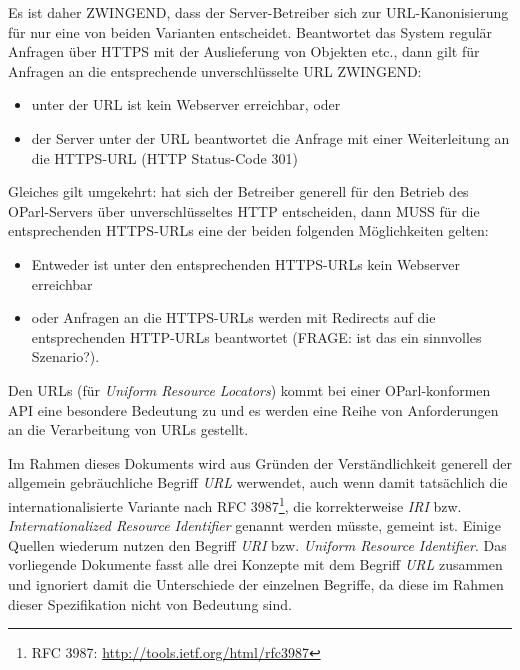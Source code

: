 \documentclass[,a4paper]{article}
\begin{document}
Es ist daher ZWINGEND, dass der Server-Betreiber sich zur
URL-Kanonisierung für nur eine von beiden Varianten entscheidet.
Beantwortet das System regulär Anfragen über HTTPS mit der Auslieferung
von Objekten etc., dann gilt für Anfragen an die entsprechende
unverschlüsselte URL ZWINGEND:

\begin{itemize}
\item
  unter der URL ist kein Webserver erreichbar, oder
\item
  der Server unter der URL beantwortet die Anfrage mit einer
  Weiterleitung an die HTTPS-URL (HTTP Status-Code 301)
\end{itemize}

Gleiches gilt umgekehrt: hat sich der Betreiber generell für den Betrieb
des OParl-Servers über unverschlüsseltes HTTP entscheiden, dann MUSS für
die entsprechenden HTTPS-URLs eine der beiden folgenden Möglichkeiten
gelten:

\begin{itemize}
\item
  Entweder ist unter den entsprechenden HTTPS-URLs kein Webserver
  erreichbar
\item
  oder Anfragen an die HTTPS-URLs werden mit Redirects auf die
  entsprechenden HTTP-URLs beantwortet (FRAGE: ist das ein sinnvolles
  Szenario?).
\end{itemize}


Den URLs (für \emph{Uniform Resource Locators}) kommt bei einer
OParl-konformen API eine besondere Bedeutung zu und es werden eine Reihe
von Anforderungen an die Verarbeitung von URLs gestellt.

Im Rahmen dieses Dokuments wird aus Gründen der Verständlichkeit
generell der allgemein gebräuchliche Begriff \emph{URL} werwendet, auch
wenn damit tatsächlich die internationalisierte Variante nach RFC
3987\footnote{RFC 3987: \url{http://tools.ietf.org/html/rfc3987}}, die
korrekterweise \emph{IRI} bzw. \emph{Internationalized Resource
Identifier} genannt werden müsste, gemeint ist. Einige Quellen wiederum
nutzen den Begriff \emph{URI} bzw. \emph{Uniform Resource Identifier}.
Das vorliegende Dokumente fasst alle drei Konzepte mit dem Begriff
\emph{URL} zusammen und ignoriert damit die Unterschiede der einzelnen
Begriffe, da diese im Rahmen dieser Spezifikation nicht von Bedeutung
sind.
\end{document}
